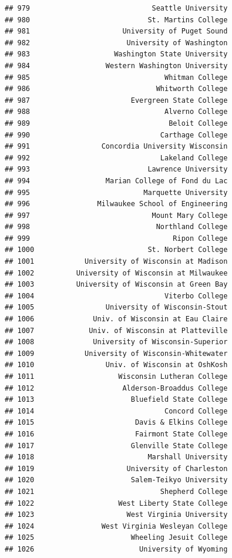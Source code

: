 \documentclass[]{article}
\begin{document}
\begin{verbatim}
## 979                             Seattle University
## 980                            St. Martins College
## 981                      University of Puget Sound
## 982                       University of Washington
## 983                    Washington State University
## 984                  Western Washington University
## 985                                Whitman College
## 986                              Whitworth College
## 987                        Evergreen State College
## 988                                Alverno College
## 989                                 Beloit College
## 990                               Carthage College
## 991                 Concordia University Wisconsin
## 992                               Lakeland College
## 993                            Lawrence University
## 994                  Marian College of Fond du Lac
## 995                           Marquette University
## 996                Milwaukee School of Engineering
## 997                             Mount Mary College
## 998                              Northland College
## 999                                  Ripon College
## 1000                           St. Norbert College
## 1001            University of Wisconsin at Madison
## 1002          University of Wisconsin at Milwaukee
## 1003          University of Wisconsin at Green Bay
## 1004                               Viterbo College
## 1005                 University of Wisconsin-Stout
## 1006              Univ. of Wisconsin at Eau Claire
## 1007             Univ. of Wisconsin at Platteville
## 1008              University of Wisconsin-Superior
## 1009            University of Wisconsin-Whitewater
## 1010                 Univ. of Wisconsin at OshKosh
## 1011                    Wisconsin Lutheran College
## 1012                     Alderson-Broaddus College
## 1013                       Bluefield State College
## 1014                               Concord College
## 1015                        Davis & Elkins College
## 1016                        Fairmont State College
## 1017                       Glenville State College
## 1018                           Marshall University
## 1019                      University of Charleston
## 1020                       Salem-Teikyo University
## 1021                              Shepherd College
## 1022                    West Liberty State College
## 1023                      West Virginia University
## 1024                West Virginia Wesleyan College
## 1025                       Wheeling Jesuit College
## 1026                         University of Wyoming
\end{verbatim}
\end{document}
